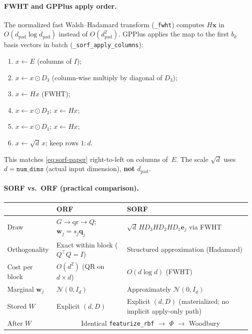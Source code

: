 \documentclass[11pt]{article}
\newcommand{\Ph}{\Phi}
\begin{document}
\paragraph{FWHT and GPPlus apply order.}
The normalized fast Walsh--Hadamard transform (\texttt{\_fwht}) computes $H\mathbf x$ in $O(d_{\mathrm{pad}}\log d_{\mathrm{pad}})$ instead of $O(d_{\mathrm{pad}}^2)$.
GPPlus applies the map to the first $b_k$ basis vectors in batch (\texttt{\_sorf\_apply\_columns}):
\begin{enumerate}
  \item $x \leftarrow E$ (columns of $I$);
  \item $x \leftarrow x \odot D_3$ (column-wise multiply by diagonal of $D_3$);
  \item $x \leftarrow Hx$ (FWHT);
  \item $x \leftarrow x \odot D_2$; \quad $x \leftarrow Hx$;
  \item $x \leftarrow x \odot D_1$; \quad $x \leftarrow Hx$;
  \item $x \leftarrow \sqrt{d}\,x$; \quad keep rows $1{:}d$.
\end{enumerate}
This matches \eqref{eq:sorf-paper} right-to-left on columns of~$E$.
The scale $\sqrt{d}$ uses $d=\texttt{num\_dims}$ (actual input dimension), \textbf{not} $d_{\mathrm{pad}}$.

\paragraph{SORF vs.\ ORF (practical comparison).}
\begin{center}
\renewcommand{\arraystretch}{1.3}
\begin{tabular}{@{}p{}p{}p{}@{}}
\toprule
 & \textbf{ORF} & \textbf{SORF} \\
\midrule
Draw & $G\to\mathrm{qr}\to Q$; $\mathbf w_j=s_j\mathbf q_j$ & $\sqrt{d}\,H D_3 H D_2 H D_1 \mathbf e_j$ via FWHT \\
Orthogonality & Exact within block ($Q^{\top}Q=I$) & Structured approximation (Hadamard) \\
Cost per block & $O(d^2)$ (QR on $d\times d$) & $O(d\log d)$ (FWHT) \\
Marginal $\mathbf w_j$ & $\mathcal N(0,I_d)$ & Approximately $\mathcal N(0,I_d)$ \\
Stored $W$ & Explicit $(d,D)$ & Explicit $(d,D)$ (materialized; no implicit apply-only path) \\
After $W$ & \multicolumn{2}{c}{Identical \texttt{featurize\_rbf} $\to$ $\Ph$ $\to$ Woodbury} \\
\bottomrule
\end{tabular}
\end{center}
\end{document}
